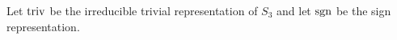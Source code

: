 \begin{example}
  Let $\operatorname{triv}$ be the irreducible trivial representation of $S_3$ and let $\operatorname{sgn}$ be the sign representation.
\end{example}











